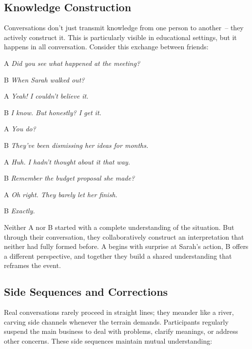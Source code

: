 \subsection{Knowledge Construction} \label{subsec:knowledge}

Conversations don't just transmit knowledge from one person to another~-- they actively construct it. This is particularly visible in educational settings, but it happens in all conversation. Consider this exchange between friends:

\ea
\begin{dialogue}
\item[A] \textit{Did you see what happened at the meeting?}
\item[B] \textit{When Sarah walked out?}
\item[A] \textit{Yeah! I couldn't believe it.}
\item[B] \textit{I know. But honestly? I get it.}
\item[A] \textit{You do?}
\item[B] \textit{They've been dismissing her ideas for months.}
\item[A] \textit{Huh. I hadn't thought about it that way.}
\item[B] \textit{Remember the budget proposal she made?}
\item[A] \textit{Oh right. They barely let her finish.}
\item[B] \textit{Exactly.}
\end{dialogue}
\z
Neither A nor B started with a complete understanding of the situation. But through their conversation, they collaboratively construct an interpretation that neither had fully formed before. A begins with surprise at Sarah's action, B offers a different perspective, and together they build a shared understanding that reframes the event.

\subsection{Side Sequences and Corrections} \label{subsec:side-seq}

Real conversations rarely proceed in straight lines; they meander like a river, carving side channels whenever the terrain demands. Participants regularly suspend the main business to deal with problems, clarify meanings, or address other concerns. These side sequences maintain mutual understanding:

